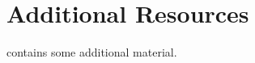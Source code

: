 \chapter{Additional Resources}
\label{sec:additional-resources}

 contains some additional material.

